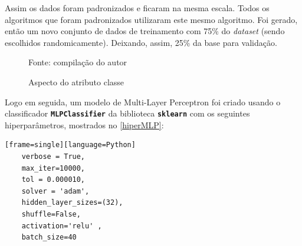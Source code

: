 Assim os dados foram padronizados e ficaram na mesma escala. Todos os algoritmos que foram padronizados utilizaram este mesmo algoritmo. Foi gerado, então um novo conjunto de dados de treinamento com 75\% do \textit{dataset} (sendo escolhidos randomicamente). Deixando, assim, 25\% da base para validação.

\begin{figure}[H]
	\centering
	\caption{Aspecto do atributo classe}
	
	\label{fig:classe}
	{\scriptsize Fonte: compilação do autor}
\end{figure}

Logo em seguida, um modelo de Multi-Layer Perceptron foi criado usando o classificador \texttt{\textbf{MLPClassifier}} da biblioteca \texttt{\textbf{sklearn}} com os seguintes hiperparâmetros, mostrados no \autoref{hiperMLP}: 


\begin{lstlisting}[caption={Hiperparâmetros do MLPClassifier},label=hiperMLP][frame=single][language=Python]
	verbose = True,
	max_iter=10000,
	tol = 0.000010,
	solver = 'adam',
	hidden_layer_sizes=(32),
	shuffle=False,
	activation='relu' ,
	batch_size=40
\end{lstlisting}


